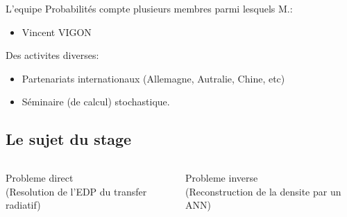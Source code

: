 \documentclass[xcolor=dvipsnames]{beamer} %
\begin{document}
	
\begin{frame}
	L'equipe Probabilités compte plusieurs membres parmi lesquels M.: %
	\begin{itemize}
		\item Vincent VIGON
  \end{itemize}

  \pause
  Des activites diverses:
	\begin{itemize}
		\item Partenariats internationaux (Allemagne, Autralie, Chine, etc)  %
		\item Séminaire (de calcul) stochastique.  %
  \end{itemize}


\end{frame}

\subsection{Le sujet du stage}

\begin{frame}

\begin{columns}
 \begin{column}{0.5\textwidth}
  \centering
    Probleme direct \\ (\scriptsize Resolution de l'EDP du transfer radiatif)
 \end{column}
 \pause
 \begin{column}{0.5\textwidth}
    \centering
    Probleme inverse \\ (\scriptsize Reconstruction de la densite par un ANN)
 \end{column}
\end{columns}

\end{frame}
\end{document}
